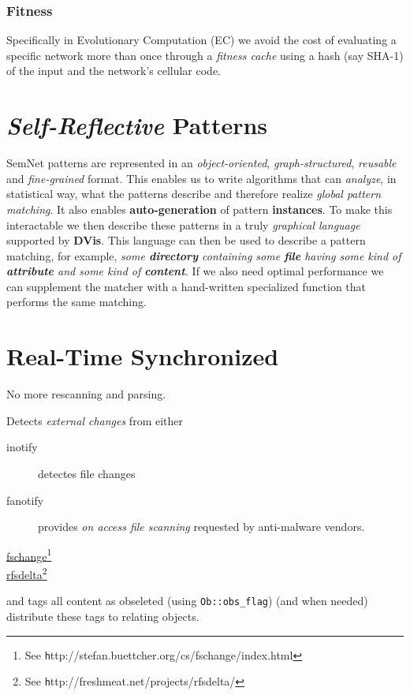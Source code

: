 \documentclass[a4paper,10pt,twocolumn]{article}
\newcommand{\codeC}[1]{\lstset{language=C}\lstinline!#1!}
\newcommand{\hrefn}[2]{\href{#1}{#2}\footnote{See {\texttt #1}}} %
\newcommand{\sn}[0]{SemNet}
\begin{document}
\subsubsection{Fitness}

Specifically in Evolutionary Computation (EC) we avoid the cost of evaluating a
specific network more than once through a \emph{fitness cache} using a hash (say
SHA-1) of the input and the network's cellular code.

\section{\emph{Self-Reflective} Patterns}

\sn{} patterns are represented in an \emph{object-oriented},
\emph{graph-structured}, \emph{reusable} and \emph{fine-grained} format. This
enables us to write algorithms that can \emph{analyze}, in statistical way, what
the patterns describe and therefore realize \emph{global pattern matching}. It
also enables \textbf{auto-generation} of pattern \textbf{instances}. To make
this interactable we then describe these patterns in a truly \emph{graphical
  language} supported by \textbf{DVis}. This language can then be used to
describe a pattern matching, for example, {\centering \emph{some
    \textbf{directory} containing some \textbf{file} having some kind of
    \textbf{attribute} and some kind of \textbf{content}.}  }  If we also need
optimal performance we can supplement the matcher with a hand-written
specialized function that performs the same matching.

\section{Real-Time Synchronized}

No more rescanning and parsing.

Detects \emph{external changes} from either
\begin{description}
\item[inotify] detectes file changes
\item[fanotify] provides \emph{on access file scanning} requested by
  anti-malware vendors.
\item[\hrefn{http://stefan.buettcher.org/cs/fschange/index.html}{fschange}]
\item[\hrefn{http://freshmeat.net/projects/rfsdelta/}{rfsdelta}]
\end{description}
and tags all content as obseleted (using \codeC{Ob::obs_flag}) (and when
needed) distribute these tags to relating objects.
\end{document}
